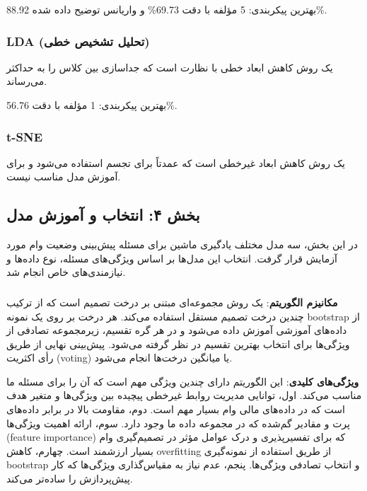 \documentclass{article}
\begin{document}
بهترین پیکربندی: 5 مؤلفه با دقت 69.73\% و واریانس توضیح داده شده 88.92\%.

\subsubsection{LDA (تحلیل تشخیص خطی)}

 یک روش کاهش ابعاد خطی با نظارت است که جداسازی بین کلاس را به حداکثر می‌رساند.

بهترین پیکربندی: 1 مؤلفه با دقت 56.76\%.

\subsubsection{t-SNE}

 یک روش کاهش ابعاد غیرخطی است که عمدتاً برای تجسم استفاده می‌شود و برای آموزش مدل مناسب نیست.

\subsection{بخش ۴: انتخاب و آموزش مدل}

در این بخش، سه مدل مختلف یادگیری ماشین برای مسئله پیش‌بینی وضعیت وام مورد آزمایش قرار گرفت. انتخاب این مدل‌ها بر اساس ویژگی‌های مسئله، نوع داده‌ها و نیازمندی‌های خاص انجام شد.

\subsubsection{}

\textbf{مکانیزم الگوریتم}:  یک روش مجموعه‌ای مبتنی بر درخت تصمیم است که از ترکیب چندین درخت تصمیم مستقل استفاده می‌کند. هر درخت بر روی یک نمونه bootstrap از داده‌های آموزشی آموزش داده می‌شود و در هر گره تقسیم، زیرمجموعه تصادفی از ویژگی‌ها برای انتخاب بهترین تقسیم در نظر گرفته می‌شود. پیش‌بینی نهایی از طریق رأی اکثریت (voting) یا میانگین درخت‌ها انجام می‌شود.

\textbf{ویژگی‌های کلیدی}: این الگوریتم دارای چندین ویژگی مهم است که آن را برای مسئله ما مناسب می‌کند. اول، توانایی مدیریت روابط غیرخطی پیچیده بین ویژگی‌ها و متغیر هدف است که در داده‌های مالی وام بسیار مهم است. دوم، مقاومت بالا در برابر داده‌های پرت و مقادیر گم‌شده که در مجموعه داده ما وجود دارد. سوم، ارائه اهمیت ویژگی‌ها (feature importance) که برای تفسیرپذیری و درک عوامل مؤثر در تصمیم‌گیری وام بسیار ارزشمند است. چهارم، کاهش overfitting از طریق استفاده از نمونه‌گیری bootstrap و انتخاب تصادفی ویژگی‌ها. پنجم، عدم نیاز به مقیاس‌گذاری ویژگی‌ها که کار پیش‌پردازش را ساده‌تر می‌کند.
\end{document}
